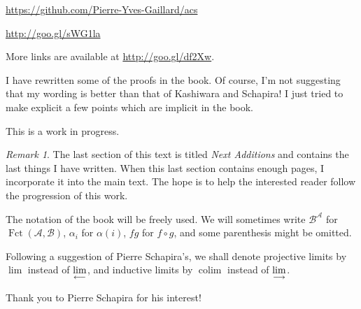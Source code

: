 \documentclass[12pt]{article}
\theoremstyle{remark}
\newtheorem{rk}[thm]{Remark}
\theoremstyle{definition}
\newcommand{\A}{\mathcal A}
\newcommand{\B}{\mathcal B}
\newcommand{\ilim}{\operatornamewithlimits{\underset{\longrightarrow}{lim}}}
\newcommand{\plim}{\operatornamewithlimits{\underset{\longleftarrow}{lim}}}
\DeclareMathOperator*{\coli}{colim}
\DeclareMathOperator{\Fct}{Fct}
\begin{document}
\noindent\href{https://github.com/Pierre-Yves-Gaillard/acs}{https://github.com/Pierre-Yves-Gaillard/acs} 

\noindent\href{http://goo.gl/sWG1la}{http://goo.gl/sWG1la}

More links are available at \href{http://goo.gl/df2Xw}{http://goo.gl/df2Xw}.

I have rewritten some of the proofs in the book. Of course, I'm not suggesting that my wording is better than that of Kashiwara and Schapira! I just tried to make explicit a few points which are implicit in the book. 

This is a work in progress. %
%
\begin{rk}\label{next}
The last section of this text is titled {\em Next Additions} and contains the last things I have written. When this last section contains enough pages, %
I incorporate it into the main text. The hope is to help the interested reader follow the progression of this work.
\end{rk}
%
The notation of the book will be freely used. We will sometimes write $\B^\A$ for $\Fct(\A,\B)$, $\alpha_i$ for $\alpha(i)$, $fg$ for $f\circ g$, and some parenthesis might be omitted. 

Following a suggestion of Pierre Schapira's, we shall denote projective limits by $\lim$ instead of $\plim$, and inductive limits by $\coli$ instead of $\ilim$. 

Thank you to Pierre Schapira for his interest!%
%
\end{document}
